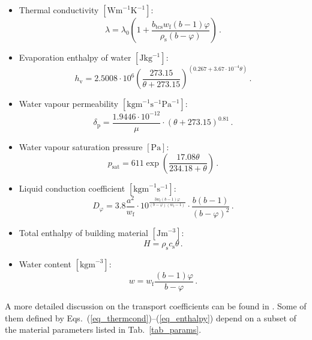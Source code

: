 \documentclass[preprint,12pt]{elsarticle}
\begin{document}
\begin{itemize}
\item
Thermal conductivity $[\mathrm{Wm}^{-1}\mathrm{K}^{-1}]$:
\begin{equation}
\lambda = \lambda_0 \left( 1+ \frac{b_{\mathrm{tcs}} w_\mathrm{f} (b-1)
\varphi}{\rho_\mathrm{s} (b - \varphi)} \right) \, . \label{eq_thermcond}
\end{equation}
\item
Evaporation enthalpy of water $[\mathrm{Jkg}^{-1}]$:
\begin{equation}
h_\mathrm{v} = 2.5008 \cdot 10^6 \left( \frac{273.15}{\theta+273.15}
\right)^{(0.267+3.67 \cdot 10^{-4} \theta)} \, .
\end{equation}
\item Water vapour permeability
$[\mathrm{kgm}^{-1}\mathrm{s}^{-1}\mathrm{Pa}^{-1}]$:
\begin{equation}
\delta_\mathrm{p} = \frac{1.9446 \cdot 10^{-12}}{\mu} \cdot \left( \theta +
273.15 \right)^{0.81} \, .
\end{equation}
\item Water vapour saturation pressure $[\mathrm{Pa}]$:
\begin{equation}
p_{\mathrm{sat}} = 611 \exp \left( \frac{17.08 \theta}{234.18 +
\theta} \right) \, .
\end{equation}
\item
Liquid conduction coefficient $[\mathrm{kgm}^{-1}\mathrm{s}^{-1}]$:
\begin{equation}
D_{\varphi} = 3.8 \frac{a^2}{w_\mathrm{f}} \cdot
10^{\frac{3w_\mathrm{f}(b-1)\varphi}{(b-\varphi)(w_\mathrm{f}-1)}} \cdot
\frac{b(b-1)}{(b-\varphi)^2} \, . \label{eq_watvapsat}
\end{equation}
\item
Total enthalpy of building material $[\mathrm{Jm}^{-3}]$:
\begin{equation}
H = \rho_\mathrm{s} c_\mathrm{s} \theta \, . \label{eq_enthalpy}
\end{equation}
\item
Water content $[\mathrm{kgm}^{-3}]$:
\begin{equation}
w = w_\mathrm{f}\frac{(b-1)\varphi}{b-\varphi} \, . \label{eq_watcont}
\end{equation}
\end{itemize}
A more detailed discussion on the transport coefficients can be found in
\cite{Kunzel:1997, Cerny:2009:CMEM}. Some of them
defined by Eqs.~(\ref{eq_thermcond})--(\ref{eq_enthalpy}) depend on
a subset of the material parameters listed in Tab.~\ref{tab_params}.
\end{document}

